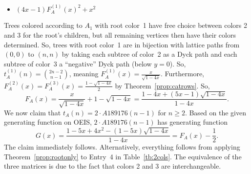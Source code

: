 \documentclass[12pt]{amsart}
\newcommand{\gfll}[1]{F_{#1}(x)}
\newcommand{\gfall}{\gfll{A}}
\newcommand{\gff}[2]{F_{#2}^{(#1)}(x)}
\newcommand{\gfa}[1]{\gff{#1}{A}}
\begin{document}
\begin{description}
    \begin{itemize}
\item $(4x - 1)\gfa{1}^2+x^2$

\end{itemize}
    \item[Discussion] 
Trees colored according to $A_1$ with root color~1 have free choice between colors 2 and 3 for the root's children, but all remaining vertices then have their colors determined. So, trees with root color~1 are in bijection with lattice paths from $(0,0)$ to $(n,n)$ by taking each subtree of color~2 as a Dyck path and each subtree of color~3 a ``negative'' Dyck path (below $y=0$). So, $t_A^{(1)}(n)=\binom{2n-2}{n-1}$, meaning
$\gfa{1}=\frac{x}{\sqrt{1-4x}}$. 
Furthermore, $\gfa{2}=\gfa{3}=\frac{1-\sqrt{1-4x}}{2}$ by Theorem~\ref{prop:catrows}.
So,
\[
\gfall=\frac{x}{\sqrt{1-4x}}+1-\sqrt{1-4x}=\frac{1-4x+(5x-1)\sqrt{1-4x}}{1-4x}.
\]
We now claim that $t_A(n)=2\cdot A189176(n-1)$ for $n\geq2$. Based on the given generating function on OEIS, $2\cdot A189176(n-1)$ has generating function
\[
G(x)=\frac{1-5x+4x^2-(1-5x)\sqrt{1-4x}}{1-4x}=F_A(x)-\frac{1}{2}.
\]
The claim immediately follows.
Alternatively, everything follows from applying Theorem~\ref{prop:rootonly} to Entry~4 in Table~\ref{tb:2cols}. The equivalence of the three matrices is due to the fact that colors 2 and 3 are interchangeable.
\end{description}
\end{document}
